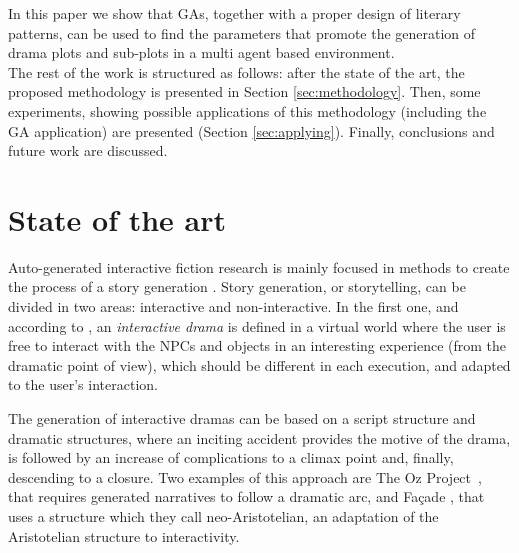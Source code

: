 \documentclass[letterpaper]{article}
\begin{document}

In this paper we show that GAs, together with a proper design of
literary patterns, can be used to find the parameters that promote the
generation of drama plots and sub-plots in a multi agent based
environment.\\


The rest of the work is structured as follows: after the state of the art, the proposed methodology is presented in Section \ref{sec:methodology}. Then, some experiments, showing possible applications of this methodology (including the GA application) are presented (Section \ref{sec:applying}). Finally, conclusions and future work are discussed.

%
%


\section{State of the art}
\label{sec:soa}


Auto-generated interactive fiction research is mainly focused in
methods to create the process of a story generation
\cite{nairat2011character}. Story generation, or storytelling, can be divided in two areas: interactive and non-interactive. In the first one, and
according to \cite{ReviewArinbjarnar09}, an {\em interactive drama} is
defined in a virtual world where the user is free to interact with
the NPCs and objects in an interesting experience (from the dramatic point of view), which should be different in each execution, and adapted to the user's interaction.

The generation of interactive dramas can be based on a script
structure \cite{ArchitectureYoung04} and dramatic structures, where an inciting accident provides the motive of the drama, is followed by an increase of complications to a climax point and, finally, descending to a closure. Two examples of this approach are The Oz Project~\cite{ozproject}, that requires generated narratives to follow a dramatic arc, and Fa\c{c}ade \cite{facade}, that uses a structure
which they call neo-Aristotelian, an adaptation of the Aristotelian
structure to interactivity.
\end{document}

